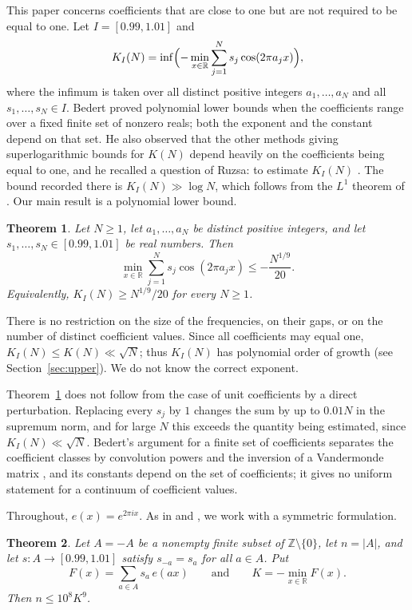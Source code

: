 \documentclass{amsart}
\newtheorem{theorem}{Theorem}[section]
\theoremstyle{remark}
\numberwithin{equation}{section}
\numberwithin{table}{section}
\newcommand{\Z}{\mathbb{Z}}
\newcommand{\R}{\mathbb{R}}
\begin{document}
This paper concerns coefficients that are close to one but are not required to be equal to one. Let $I=[0.99,1.01]$ and
\[
K_I(N)=\inf\Bigl(-\min_{x\in\R}\sum_{j=1}^{N}s_j\cos(2\pi a_jx)\Bigr),
\]
where the infimum is taken over all distinct positive integers $a_1,\dots,a_N$ and all $s_1,\dots,s_N\in I$. Bedert \cite[Theorems~1.2 and 6.1]{Bed} proved polynomial lower bounds when the coefficients range over a fixed finite set of nonzero reals; both the exponent and the constant depend on that set. He also observed that the other methods giving superlogarithmic bounds for $K(N)$ depend heavily on the coefficients being equal to one, and he recalled a question of Ruzsa: to estimate $K_I(N)$ \cite[Section~1]{Bed}. The bound recorded there is $K_I(N)\gg\log N$, which follows from the $L^1$ theorem of \cite{MPS}. Our main result is a polynomial lower bound.

\begin{theorem}\label{thm:main}
Let $N\ge1$, let $a_1,\dots,a_N$ be distinct positive integers, and let $s_1,\dots,s_N\in[0.99,1.01]$ be real numbers. Then
\[
\min_{x\in\R}\sum_{j=1}^{N}s_j\cos(2\pi a_jx)\le-\frac{N^{1/9}}{20}.
\]
Equivalently, $K_I(N)\ge N^{1/9}/20$ for every $N\ge1$.
\end{theorem}

There is no restriction on the size of the frequencies, on their gaps, or on the number of distinct coefficient values. Since all coefficients may equal one, $K_I(N)\le K(N)\ll\sqrt N$; thus $K_I(N)$ has polynomial order of growth (see Section~\ref{sec:upper}). We do not know the correct exponent.

Theorem~\ref{thm:main} does not follow from the case of unit coefficients by a direct perturbation. Replacing every $s_j$ by $1$ changes the sum by up to $0.01N$ in the supremum norm, and for large $N$ this exceeds the quantity being estimated, since $K_I(N)\ll\sqrt N$. Bedert's argument for a finite set of coefficients separates the coefficient classes by convolution powers and the inversion of a Vandermonde matrix \cite[Section~6]{Bed}, and its constants depend on the set of coefficients; it gives no uniform statement for a continuum of coefficient values.

Throughout, $e(x)=e^{2\pi ix}$. As in \cite{Bed} and \cite{Sha}, we work with a symmetric formulation.

\begin{theorem}\label{thm:sym}
Let $A=-A$ be a nonempty finite subset of $\Z\setminus\{0\}$, let $n=|A|$, and let $s\colon A\to[0.99,1.01]$ satisfy $s_{-a}=s_a$ for all $a\in A$. Put
\[
F(x)=\sum_{a\in A}s_a\,e(ax)\qquad\text{and}\qquad K=-\min_{x\in\R}F(x).
\]
Then $n\le10^8K^9$.
\end{theorem}
\end{document}
